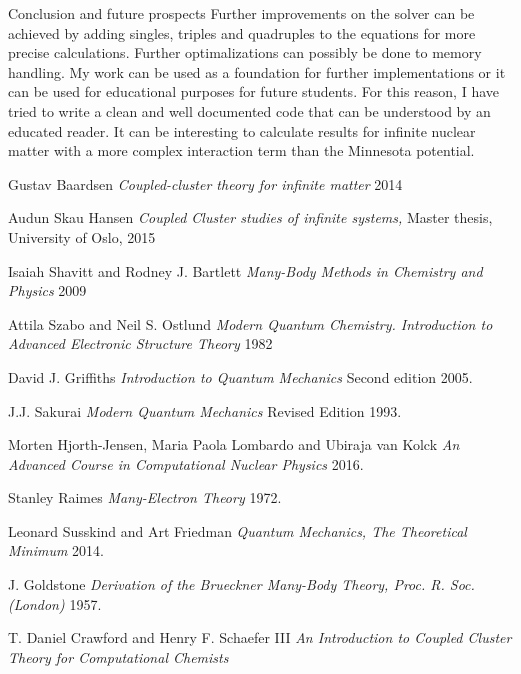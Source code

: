 \documentclass[twoside,english]{uiofysmaster}
\begin{document}
\begin{chapter}{Conclusion and future prospects}
	Further improvements on the solver can be achieved by adding singles, triples and quadruples to the equations for more precise calculations. Further optimalizations can possibly be done to memory handling. My work can be used as a foundation for further implementations or it can be used for educational purposes for future students. For this reason, I have tried to write a clean and well documented code that can be understood by an educated reader. It can be interesting to calculate results for infinite nuclear matter with a more complex interaction term than the Minnesota potential.
\end{chapter}


\medskip


\begin{thebibliography}{9}

	Gustav Baardsen
	\textit{Coupled-cluster theory for infinite matter} 2014

	Audun Skau Hansen
	\textit{Coupled Cluster studies of infinite systems,} Master thesis, University of Oslo, 2015

	Isaiah Shavitt and Rodney J. Bartlett
	\textit{Many-Body Methods in Chemistry and Physics} 2009

	Attila Szabo and Neil S. Ostlund
	\textit{Modern Quantum Chemistry. Introduction to Advanced Electronic Structure Theory} 1982

	David J. Griffiths
	\textit{Introduction to Quantum Mechanics} Second edition 2005.

	J.J. Sakurai
	\textit{Modern Quantum Mechanics} Revised Edition 1993.

	Morten Hjorth-Jensen, Maria Paola Lombardo and Ubiraja van Kolck
	\textit{An Advanced Course in Computational Nuclear Physics} 2016.

	Stanley Raimes
	\textit{Many-Electron Theory} 1972.

	Leonard Susskind and Art Friedman
	\textit{Quantum Mechanics, The Theoretical Minimum} 2014.

	J. Goldstone
	\textit{Derivation of the Brueckner Many-Body Theory, Proc. R. Soc. (London)} 1957. 

	T. Daniel Crawford and Henry F. Schaefer III
	\textit{An Introduction to Coupled Cluster Theory for Computational Chemists} 


\end{thebibliography}
\end{document}
